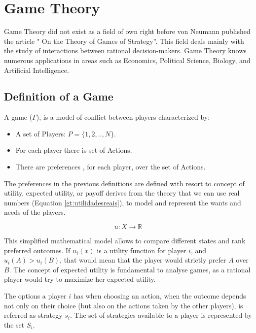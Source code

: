 \clearpage
\section{Game Theory}
\label{sec:background:game_theory}

Game Theory did not exist as a field of own right before von Neumann published the article " On the Theory of Games of Strategy''. This field deals mainly with the study of interactions between rational decision-makers\cite{Neumann1944}. Game Theory knows numerous applications in areas such as Economics, Political Science, Biology, and Artificial Intelligence. 

\subsection{Definition of a Game}
\label{subsec:background:game_theory_definition}

A game ($\Gamma$), is a model of conflict between players characterized by\cite{Osborne2004}\cite{OsbRub94}\cite{Fra2011}:
\begin{itemize}
\item A set of Players: $P=\{1, 2, .., N \}$.
\item For each player there is set of Actions.
\item There are preferences , for each player, over the set of Actions.
\end{itemize}


The preferences in the previous definitions are defined with resort to concept of utility, expected utility, or payoff derives from the theory that we can use real numbers (Equation \ref{gt:utilidadesreais}), to model and represent the wants and needs of the players. 

\begin{equation}
u:X\rightarrow\mathbb{R}
\label{gt:utilidadesreais}
\end{equation}

This simplified mathematical model allows to compare different states and rank preferred outcomes. If $u_{i}(x)$ is a utility function for player $i$, and $u_{i}(A)>u_{i}(B)$, that would mean that the player would strictly prefer $A$ over $B$. The concept of expected utility is fundamental to analyse games, as a rational player would try to maximize her expected utility\cite{Neumann1944}\cite{Osborne2004}\cite{Leyton-Brown2008:Essentials_Game_Theory}.


The options a player $i$ has when choosing an action, when the outcome depends not only on their choice (but also on the actions taken by the other players), is referred as strategy $s_{i}$. The set of strategies available to a player is represented by the set $S_{i}$.

